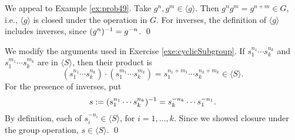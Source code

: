 \documentclass[../algebraNotesMSRI-UP2016.tex]{subfiles}
\begin{document}
\begin{frame}{}
We appeal to Example \ref{ex:prob49}.  Take $g^n,g^m\in \langle g\rangle$.  Then $g^ng^m=g^{n+m}\in G$, i.e., $\langle g\rangle$ is closed under the operation in $G$.  For inverses, the definition of $\langle g\rangle$ includes inverses, since $(g^n)^{-1}=g^{-n}$.
\qed

\smallGap
{}
We modify the arguments used in Exercise \ref{exe:cyclicSubgroup}.  If $s_1^{n_1}\cdots s_k^{n_k}$ and $s_1^{m_1}\cdots s_k^{m_k}$ are in  $\langle S\rangle$, then their product is
\[
(s_1^{n_1}\cdots s_k^{n_k})\cdot (s_1^{m_1}\cdots s_k^{m_k})=s_1^{n_1+m_1}\cdots s_k^{n_k+m_k}\in \langle S\rangle.
\]
For the presence of inverses, put
\[
s:=(s_1^{n_1}\cdots s_k^{n_k})^{-1}=s_k^{-n_k}\cdots s_1^{-n_1}.
\]
By definition, each of $s_i^{-n_i}\in \langle S\rangle$, for $i=1,\dots,k$.  Since we showed closure under the group operation, $s\in\langle S\rangle$.
\qed
\end{frame}

\end{document}
